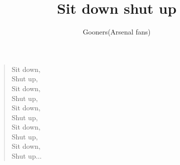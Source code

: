 \documentclass[a4paper,12pt]{article}
\title{Sit down shut up}
\author{Gooners(Arsenal fans)}
\date{}
\begin{document}
	
	\maketitle
	
	\begin{verse}
		
		Sit down, \\
		Shut up, \\
		Sit down, \\
		Shut up, \\
		Sit down, \\
		Shut up, \\
		Sit down, \\
		Shut up, \\
		Sit down, \\
		Shut up$\ldots$
		
	\end{verse}
	
\end{document}
